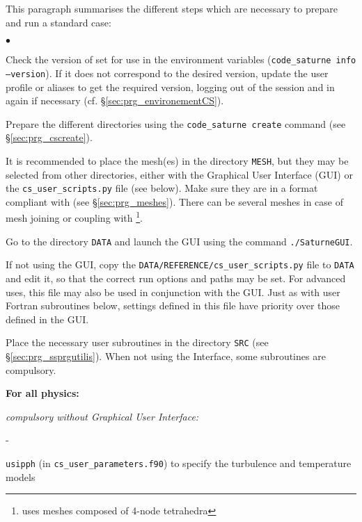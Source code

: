 {{{{{This paragraph summarises the different steps which are necessary to
prepare and run a standard case:

\begin{list}{$\bullet$}{}

\item Check the version of \CS set for use in the environment variables
(\texttt{code\_saturne~info --version}). If it does not correspond to
the desired version, update the user profile or aliases to get the
required version, logging out of the session and in again if necessary (cf.
\S\ref{sec:prg_environementCS}).

\item Prepare the different directories using the \texttt{code\_saturne~create}
command (see \S\ref{sec:prg_cscreate}).

\item It is recommended to place the mesh(es) in the directory \texttt{MESH},
but they may be selected from other directories, either with the Graphical User Interface (GUI)
 or the \texttt{cs\_user\_scripts.py} file (see below). Make sure they are
in a format compliant with \CS (see \S\ref{sec:prg_meshes}). There can be
several meshes in case of mesh joining or coupling with
\syrthes\footnote{ uses meshes composed of 4-node tetrahedra}.

\item Go to the directory \texttt{DATA} and launch the
      GUI using the command \texttt{./SaturneGUI}.

\item If not using the GUI, copy the
  \texttt{DATA/REFERENCE/cs\_user\_scripts.py} file to \texttt{DATA} and
  edit it, so that the correct run options and paths may be set. For advanced
  uses, this file may also be used in conjunction with the GUI. Just as with
  user Fortran subroutines below, settings defined in this file have priority
  over those defined in the GUI.

\item Place the necessary user subroutines in the directory \texttt{SRC} (see
\S\ref{sec:prg_ssprgutilis}). When not using the Interface, some subroutines are
compulsory.

\begin{list}{}{}

\item {\bf For all physics:}

    \begin{list}{}{}
        \item {\em compulsory without Graphical User Interface:}
        \begin{list}{-}{}
            \item \texttt{usipph} (in \texttt{cs\_user\_parameters.f90}) to
              specify the turbulence and temperature models


\end{list}
\end{list}
\end{list}
\end{list}}}}}}
